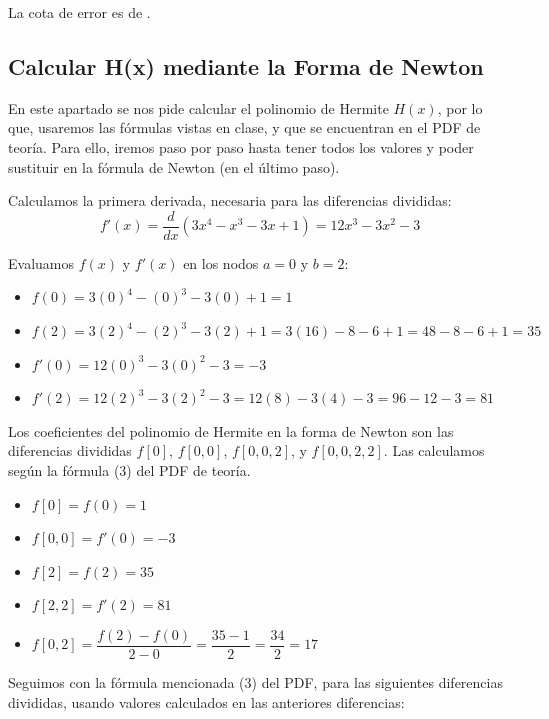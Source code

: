 \documentclass{article}
\begin{document}
La cota de error es de .

\subsection{Calcular H(x) mediante la Forma de Newton}

En este apartado se nos pide calcular el polinomio de Hermite $H(x)$, por lo que, usaremos las fórmulas vistas en clase, y que se encuentran en el PDF de teoría. Para ello, iremos paso por paso hasta tener todos los valores y poder sustituir en la fórmula de Newton (en el último paso).

Calculamos la primera derivada, necesaria para las diferencias divididas:
$$ f'(x) = \frac{d}{dx}(3x^4 - x^3 - 3x + 1) = 12x^3 - 3x^2 - 3 $$

Evaluamos \(f(x)\) y \(f'(x)\) en los nodos \(a=0\) y \(b=2\):
\begin{itemize}
    \item \(f(0) = 3(0)^4 - (0)^3 - 3(0) + 1 = 1\)
    \item \(f(2) = 3(2)^4 - (2)^3 - 3(2) + 1 = 3(16) - 8 - 6 + 1 = 48 - 8 - 6 + 1 = 35\)
    \item \(f'(0) = 12(0)^3 - 3(0)^2 - 3 = -3\)
    \item \(f'(2) = 12(2)^3 - 3(2)^2 - 3 = 12(8) - 3(4) - 3 = 96 - 12 - 3 = 81\)
\end{itemize}

Los coeficientes del polinomio de Hermite en la forma de Newton son las diferencias divididas \(f[0]\), \(f[0,0]\), \(f[0,0,2]\), y \(f[0,0,2,2]\). Las calculamos según la fórmula ($3$) del PDF de teoría.

\begin{itemize}
    \item \(f[0] = f(0) = 1\)
    \item \(f[0,0] = f'(0) = -3\)
    \item \(f[2] = f(2) = 35\)
    \item \(f[2,2] = f'(2) = 81\)
\end{itemize}

\begin{itemize}
    \item \(f[0,2] = \dfrac{f(2) - f(0)}{2-0} = \dfrac{35 - 1}{2} = \dfrac{34}{2} = 17\)
\end{itemize}

Seguimos con la fórmula mencionada ($3$) del PDF, para las siguientes diferencias divididas, usando valores calculados en las anteriores diferencias:
\end{document}
